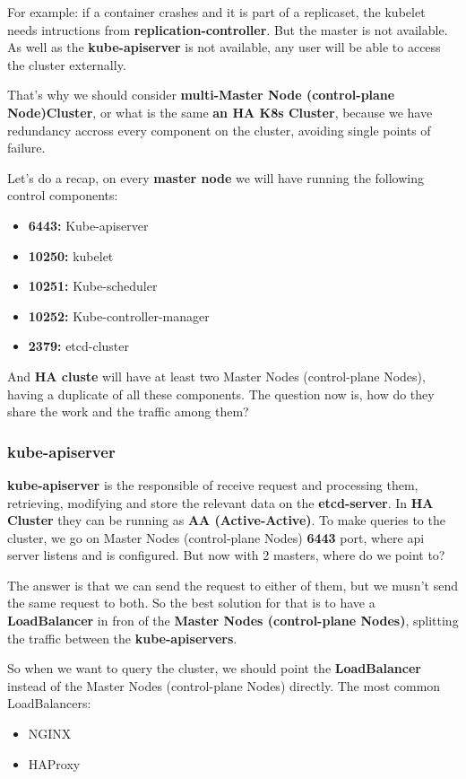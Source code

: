 \documentclass{article}
\begin{document}
For example: if a container crashes and it is part of a replicaset, the kubelet needs intructions from 
\textbf{replication-controller}. But the master is not available. As well as the \textbf{kube-apiserver} is not available, any user will be able to access the cluster externally.

That's why we should consider \textbf{multi-Master Node (control-plane Node)Cluster}, or what is the same \textbf{an HA K8s Cluster}, because we have redundancy accross every component on the cluster, avoiding single points of failure.

Let's do a recap, on every \textbf{master node} we will have running the following control components:
\begin{itemize}
    \item \textbf{6443:} Kube-apiserver
    \item \textbf{10250:} kubelet
    \item \textbf{10251:} Kube-scheduler
    \item \textbf{10252:} Kube-controller-manager
    \item \textbf{2379:} etcd-cluster
\end{itemize}

And \textbf{HA cluste} will have at least two Master Nodes (control-plane Nodes), having a duplicate of all these components. The question now is, how do they share the work and the traffic among them?

\subsubsection{kube-apiserver}
\textbf{kube-apiserver} is the responsible of receive request and processing them, retrieving, modifying and store the relevant data on the \textbf{etcd-server}. In \textbf{HA Cluster} they can be running as \textbf{AA (Active-Active)}. To make queries to the cluster, we go on Master Nodes (control-plane Nodes) \textbf{6443} port, where api server listens and is configured.
But now with 2 masters, where do we point to?

The answer is that we can send the request to either of them, but we musn't send the same request to both. So the best solution for that is to have a \textbf{LoadBalancer} in fron of the \textbf{Master Nodes (control-plane Nodes)}, splitting the traffic between the \textbf{kube-apiservers}.

So when we want to query the cluster, we should point the \textbf{LoadBalancer} instead of the Master Nodes (control-plane Nodes) directly. The most common LoadBalancers:
\begin{itemize}
    \item NGINX
    \item HAProxy
\end{itemize}
\end{document}
